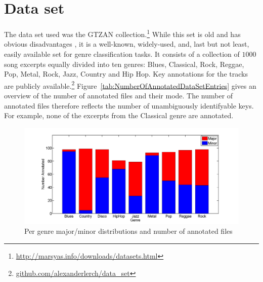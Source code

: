 \documentclass{article}
\begin{document}
\section{Data set}\label{sec:dataset}
The data set used was the GTZAN collection.\footnote{\url{http://marsyas.info/downloads/datasets.html}} While this set is old and has obvious disadvantages \cite{sturm_analysis_2012}, it is a well-known, widely-used, and, last but not least, easily available set for genre classification tasks. It consists of a collection of $1000$ song excerpts equally divided into ten genres: Blues, Classical, Rock, Reggae, Pop, Metal, Rock, Jazz, Country and Hip Hop. 
Key annotations for the tracks are publicly available.\footnote{\url{github.com/alexanderlerch/data_set}} Figure~\ref{tab:NumberOfAnnotatedDataSetEntries} gives an overview of the number of annotated files and their mode. The number of annotated files therefore reflects the number of unambiguously identifyable keys.
For example, none of the excerpts from the Classical genre are annotated. 

\begin{figure}[tb]\label{tab:NumberOfAnnotatedDataSetEntries}
    \includegraphics[scale=.2]{graph/annotated}
	\caption{Per genre major/minor distributions and number of annotated files}
	\label{fig:confPC+MFCC}
\end{figure}
\end{document}
